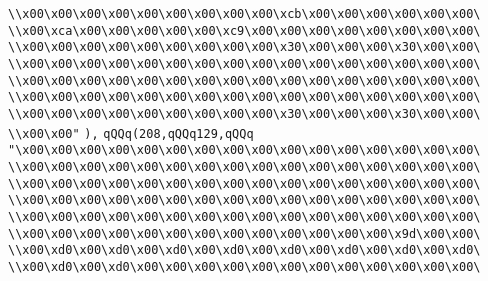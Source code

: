 \verb|\\x00\x00\x00\x00\x00\x00\x00\x00\x00\xcb\x00\x00\x00\x00\x00\x00\|\newline
\verb|\\x00\xca\x00\x00\x00\x00\x00\xc9\x00\x00\x00\x00\x00\x00\x00\x00\|\newline
\verb|\\x00\x00\x00\x00\x00\x00\x00\x00\x00\x30\x00\x00\x00\x30\x00\x00\|\newline
\verb|\\x00\x00\x00\x00\x00\x00\x00\x00\x00\x00\x00\x00\x00\x00\x00\x00\|\newline
\verb|\\x00\x00\x00\x00\x00\x00\x00\x00\x00\x00\x00\x00\x00\x00\x00\x00\|\newline
\verb|\\x00\x00\x00\x00\x00\x00\x00\x00\x00\x00\x00\x00\x00\x00\x00\x00\|\newline
\verb|\\x00\x00\x00\x00\x00\x00\x00\x00\x00\x30\x00\x00\x00\x30\x00\x00\|\newline
\verb|\\x00\x00"|\newline
\verb|),|\newline
\verb|qQQq(208,qQQq129,qQQq|\newline
\verb|"\x00\x00\x00\x00\x00\x00\x00\x00\x00\x00\x00\x00\x00\x00\x00\x00\|\newline
\verb|\\x00\x00\x00\x00\x00\x00\x00\x00\x00\x00\x00\x00\x00\x00\x00\x00\|\newline
\verb|\\x00\x00\x00\x00\x00\x00\x00\x00\x00\x00\x00\x00\x00\x00\x00\x00\|\newline
\verb|\\x00\x00\x00\x00\x00\x00\x00\x00\x00\x00\x00\x00\x00\x00\x00\x00\|\newline
\verb|\\x00\x00\x00\x00\x00\x00\x00\x00\x00\x00\x00\x00\x00\x00\x00\x00\|\newline
\verb|\\x00\x00\x00\x00\x00\x00\x00\x00\x00\x00\x00\x00\x00\x9d\x00\x00\|\newline
\verb|\\x00\xd0\x00\xd0\x00\xd0\x00\xd0\x00\xd0\x00\xd0\x00\xd0\x00\xd0\|\newline
\verb|\\x00\xd0\x00\xd0\x00\x00\x00\x00\x00\x00\x00\x00\x00\x00\x00\x00\|\newline
